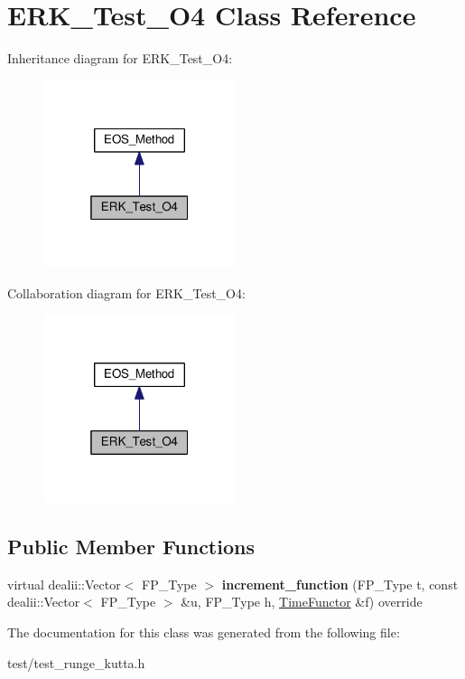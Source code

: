 \hypertarget{classERK__Test__O4}{}\section{E\+R\+K\+\_\+\+Test\+\_\+\+O4 Class Reference}
\label{classERK__Test__O4}


Inheritance diagram for E\+R\+K\+\_\+\+Test\+\_\+\+O4\+:\nopagebreak
\begin{figure}[H]
\begin{center}
\leavevmode
\includegraphics[width=160pt]{classERK__Test__O4__inherit__graph}
\end{center}
\end{figure}


Collaboration diagram for E\+R\+K\+\_\+\+Test\+\_\+\+O4\+:\nopagebreak
\begin{figure}[H]
\begin{center}
\leavevmode
\includegraphics[width=160pt]{classERK__Test__O4__coll__graph}
\end{center}
\end{figure}
\subsection*{Public Member Functions}
\begin{DoxyCompactItemize}
\item 
\mbox{\label{classERK__Test__O4_a5df4129a566b7d9422378d7869c181b7}} 
virtual dealii\+::\+Vector$<$ F\+P\+\_\+\+Type $>$ {\bfseries increment\+\_\+function} (F\+P\+\_\+\+Type t, const dealii\+::\+Vector$<$ F\+P\+\_\+\+Type $>$ \&u, F\+P\+\_\+\+Type h, \hyperlink{classTimeFunctor}{Time\+Functor} \&f) override
\end{DoxyCompactItemize}


The documentation for this class was generated from the following file\+:\begin{DoxyCompactItemize}
\item 
test/test\+\_\+runge\+\_\+kutta.\+h\end{DoxyCompactItemize}
